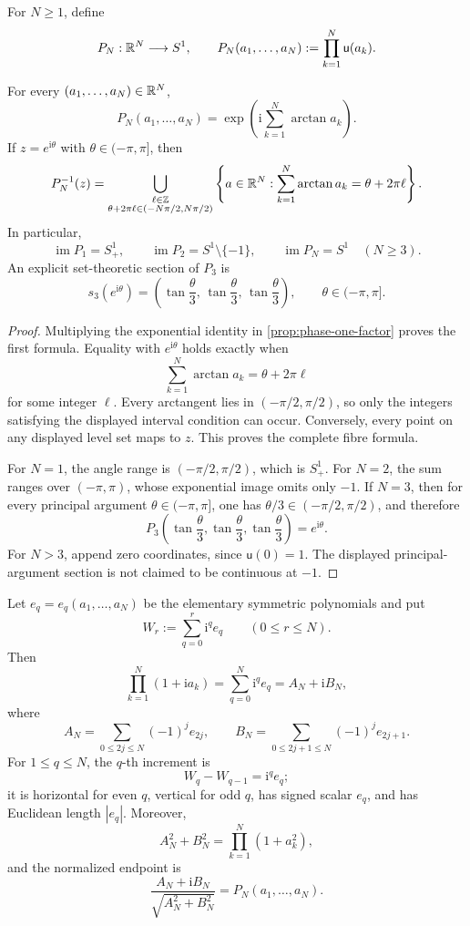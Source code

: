 For \(N\geq1\), define
\[
 P_N:\mathbb R^N\longrightarrow S^1,
 \qquad
 P_N(a_1,\ldots,a_N):=\prod_{k=1}^N\mathsf u(a_k).
\]

\begin{theorem}
\label{thm:phase-finite-products}
For every \((a_1,\ldots,a_N)\in\mathbb R^N\),
\[
 P_N(a_1,\ldots,a_N)
 =
 \exp\left(\mathrm i\sum_{k=1}^N\arctan a_k\right).
\]
If \(z=e^{\mathrm i\theta}\) with \(\theta\in(-\pi,\pi]\), then
\[
 P_N^{-1}(z)
 =
 \bigcup_{\substack{\ell\in\mathbb Z\\
 \theta+2\pi\ell\in(-N\pi/2,N\pi/2)}}
 \left\{
 a\in\mathbb R^N:
 \sum_{k=1}^N\arctan a_k=\theta+2\pi\ell
 \right\}.
\]
In particular,
\[
 \operatorname{im}P_1=S^1_+,
 \qquad
 \operatorname{im}P_2=S^1\setminus\{-1\},
 \qquad
 \operatorname{im}P_N=S^1\quad(N\geq3).
\]
An explicit set-theoretic section of \(P_3\) is
\[
 s_3(e^{\mathrm i\theta})
 =
 \left(
 \tan\frac\theta3,\,
 \tan\frac\theta3,\,
 \tan\frac\theta3
 \right),
 \qquad \theta\in(-\pi,\pi].
\]
\end{theorem}

\begin{proof}
Multiplying the exponential identity in \cref{prop:phase-one-factor} proves
the first formula.  Equality with \(e^{\mathrm i\theta}\) holds exactly when
\[
 \sum_{k=1}^N\arctan a_k=\theta+2\pi\ell
\]
for some integer \(\ell\).  Every arctangent lies in
\((-\pi/2,\pi/2)\), so only the integers satisfying the displayed interval
condition can occur.  Conversely, every point on any displayed level set maps
to \(z\).  This proves the complete fibre formula.

For \(N=1\), the angle range is \((-\pi/2,\pi/2)\), which is \(S^1_+\).
For \(N=2\), the sum ranges over \((-\pi,\pi)\), whose exponential image omits
only \(-1\).  If \(N=3\), then for every principal argument
\(\theta\in(-\pi,\pi]\), one has \(\theta/3\in(-\pi/2,\pi/2)\), and therefore
\[
 P_3\left(\tan\frac\theta3,\tan\frac\theta3,\tan\frac\theta3\right)
 =
 e^{\mathrm i\theta}.
\]
For \(N>3\), append zero coordinates, since \(\mathsf u(0)=1\).
The displayed principal-argument section is not claimed to be continuous at
\(-1\).
\end{proof}

\begin{proposition}
\label{prop:phase-orthogonal-walk}
Let \(e_q=e_q(a_1,\ldots,a_N)\) be the elementary symmetric polynomials and
put
\[
 W_r:=\sum_{q=0}^r\mathrm i^q e_q
 \qquad(0\leq r\leq N).
\]
Then
\[
 \prod_{k=1}^N(1+\mathrm ia_k)
 =
 \sum_{q=0}^N\mathrm i^q e_q
 =
 A_N+\mathrm iB_N,
\]
where
\[
 A_N=\sum_{0\leq2j\leq N}(-1)^j e_{2j},
 \qquad
 B_N=\sum_{0\leq2j+1\leq N}(-1)^j e_{2j+1}.
\]
For \(1\leq q\leq N\), the \(q\)-th increment is
\[
 W_q-W_{q-1}=\mathrm i^q e_q;
\]
it is horizontal for even \(q\), vertical for odd \(q\), has signed scalar
\(e_q\), and has Euclidean length \(|e_q|\).  Moreover,
\[
 A_N^2+B_N^2=\prod_{k=1}^N(1+a_k^2),
\]
and the normalized endpoint is
\[
 \frac{A_N+\mathrm iB_N}{\sqrt{A_N^2+B_N^2}}
 =
 P_N(a_1,\ldots,a_N).
\]
\end{proposition}


